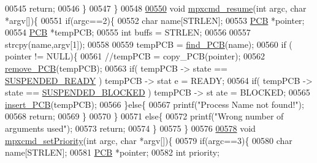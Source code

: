 \begin{DoxyCode}
{00545                 \textcolor{keywordflow}{return};
00546         \}
00547 \}
00548 
\hypertarget{mpx__r2_8c_source_l00550}{}\hyperlink{mpx__r2_8h_a3c47daf087934d234d896e35e4c03f3b}{00550} \textcolor{keywordtype}{void} \hyperlink{mpx__r2_8c_a3c47daf087934d234d896e35e4c03f3b}{mpxcmd_resume}(\textcolor{keywordtype}{int} argc, \textcolor{keywordtype}{char} *argv[])\{
00551         \textcolor{keywordflow}{if}(argc==2)\{
00552                 \textcolor{keywordtype}{char} name[STRLEN];
00553                 \hyperlink{structprocess}{PCB} *pointer;
00554                 \hyperlink{structprocess}{PCB} *tempPCB;
00555                 \textcolor{keywordtype}{int} buffs = STRLEN;
00556                 
00557                 strcpy(name,argv[1]);
00558                 
00559                 tempPCB = \hyperlink{mpx__r2_8c_a612a6abcb66c688a32f33abc93ff3990}{find_PCB}(name);
00560                 \textcolor{keywordflow}{if} ( pointer != NULL)\{
00561                         \textcolor{comment}{//tempPCB = copy\_PCB(pointer);}
00562                         \hyperlink{mpx__r2_8c_af30a3658210d449b4b53e5be2ed2bc2e}{remove_PCB}(tempPCB);
00563                         \textcolor{keywordflow}{if}( tempPCB -> state == \hyperlink{mpx__r2_8h_a07b1141143e8825b04670da23fca8cc7}{SUSPENDED_READY} ) tempPCB -> stat
      e = READY;
00564                         \textcolor{keywordflow}{if}( tempPCB -> state == \hyperlink{mpx__r2_8h_a6e41bb5a80c5049e8d364bab8ee4d73a}{SUSPENDED_BLOCKED} ) tempPCB -> st
      ate = BLOCKED;
00565                         \hyperlink{mpx__r2_8c_aa3b334e3a5afd6e590917667ad359a6f}{insert_PCB}(tempPCB);
00566                 \}\textcolor{keywordflow}{else}\{
00567                         printf(\textcolor{stringliteral}{"Process Name not found!"});
00568                         \textcolor{keywordflow}{return};
00569                 \}
00570         \}
00571         \textcolor{keywordflow}{else}\{
00572                 printf(\textcolor{stringliteral}{"Wrong number of arguments used"});       
00573                 \textcolor{keywordflow}{return};
00574         \}
00575 \}
00576 
\hypertarget{mpx__r2_8c_source_l00578}{}\hyperlink{mpx__r2_8h_a4505a685b9ab69940541dc4e973e0f01}{00578} \textcolor{keywordtype}{void} \hyperlink{mpx__r2_8c_a4505a685b9ab69940541dc4e973e0f01}{mpxcmd_setPriority}(\textcolor{keywordtype}{int} argc, \textcolor{keywordtype}{char} *argv[])\{ 
00579         \textcolor{keywordflow}{if}(argc==3)\{
00580                 \textcolor{keywordtype}{char} name[STRLEN];
00581                 \hyperlink{structprocess}{PCB} *pointer;
00582                 \textcolor{keywordtype}{int} priority;
}
\end{DoxyCode}
